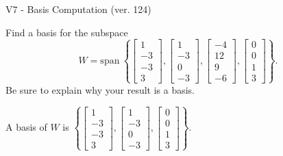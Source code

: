 \begin{exercise}
  \begin{exerciseTitle}V7 - Basis Computation (ver. 124)\end{exerciseTitle}
  \begin{exerciseStatement}
    Find a basis for the subspace 
\[W=\mathrm{span}\ \left\{\left[\begin{array}{r}
1 \\
-3 \\
-3 \\
3
\end{array}\right] , \left[\begin{array}{r}
1 \\
-3 \\
0 \\
-3
\end{array}\right] , \left[\begin{array}{r}
-4 \\
12 \\
9 \\
-6
\end{array}\right] , \left[\begin{array}{r}
0 \\
0 \\
1 \\
3
\end{array}\right]\right\}.\]
 Be sure to explain why your result is a basis.


  \end{exerciseStatement}
  \begin{exerciseAnswer}
   A basis of \(W\) is  \(\left\{\left[\begin{array}{r}
1 \\
-3 \\
-3 \\
3
\end{array}\right] , \left[\begin{array}{r}
1 \\
-3 \\
0 \\
-3
\end{array}\right] , \left[\begin{array}{r}
0 \\
0 \\
1 \\
3
\end{array}\right]\right\}\).
  


  \end{exerciseAnswer}
\end{exercise}